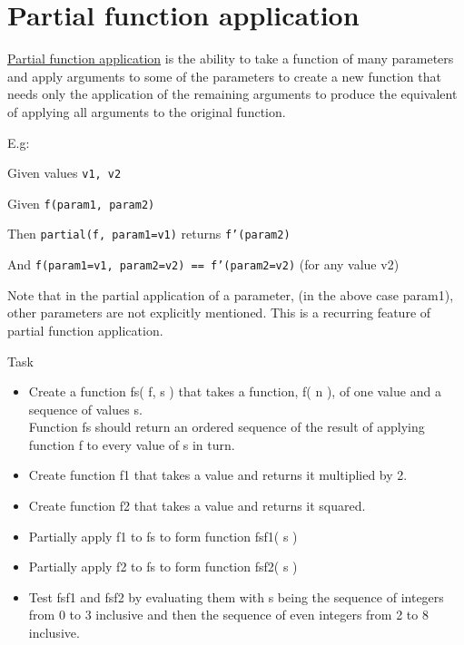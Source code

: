 \pagebreak{}
\section*{Partial function application}

\href{http://en.wikipedia.org/wiki/Partial\_application}{Partial
function application} is the ability to take a function of many
parameters and apply arguments to some of the parameters to create a new
function that needs only the application of the remaining arguments to
produce the equivalent of applying all arguments to the original
function.

E.g:

Given values \texttt{v1, v2}

Given \texttt{f(param1, param2)}

Then \texttt{partial(f, param1=v1)} returns \texttt{f'(param2)}

And \texttt{f(param1=v1, param2=v2) == f'(param2=v2)} (for any value v2)

Note that in the partial application of a parameter, (in the above case
param1), other parameters are not explicitly mentioned. This is a
recurring feature of partial function application.

Task

\begin{itemize}
\item
  Create a function fs( f, s ) that takes a function, f( n ), of one
  value and a sequence of values s.\\ Function fs should return an
  ordered sequence of the result of applying function f to every value
  of s in turn.
\end{itemize}

\begin{itemize}
\item
  Create function f1 that takes a value and returns it multiplied by 2.
\item
  Create function f2 that takes a value and returns it squared.
\end{itemize}

\begin{itemize}
\item
  Partially apply f1 to fs to form function fsf1( s )
\item
  Partially apply f2 to fs to form function fsf2( s )
\end{itemize}

\begin{itemize}
\item
  Test fsf1 and fsf2 by evaluating them with s being the sequence of
  integers from 0 to 3 inclusive and then the sequence of even integers
  from 2 to 8 inclusive.
\end{itemize}

